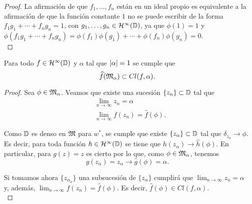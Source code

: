 \begin{proof}
La afirmación de que $f_1, \dots, f_n$ están en un ideal propio es equivalente a la afirmación de que la función constante $1$ no se puede escribir de la forma $f_1 g_1 + \cdots + f_n g_n = 1$, con $g_1, \dots, g_n \in \mathcal{H}^{\infty}(\mathbb{D})$, ya que $\phi (1) = 1$ y $\phi (f_1 g_1 + \cdots + f_n g_n) = \phi (f_1) \phi (g_1) + \cdots + \phi (f_n) \phi (g_n) = 0$. \\
\end{proof}

\begin{prop}
    Para todo $f \in \mathcal{H}^{\infty}(\mathbb{D})$ y $\alpha$ tal que $\left\lvert\alpha\right\rvert = 1$ se cumple que
    \begin{equation*}
        \widehat{f} (\mathfrak{M}_\alpha) \subset Cl(f, \alpha).
    \end{equation*}
\end{prop}

\begin{proof}
    Sea $\phi \in \mathfrak{M}_\alpha$. Veamos que existe una sucesión $\{ z_n\} \subset \mathbb{D}$ tal que
     \leqnomode
    \begin{align}
        & \lim_{n \rightarrow \infty} z_n = \alpha \\
        & \lim_{n \rightarrow \infty} f(z_n)= \widehat{f} (\phi).
    \end{align}

    Como $\mathbb{D}$ es denso en $\mathfrak{M}$ para $w^*$, se cumple que existe $\{z_\alpha\} \subset \mathbb{D}$ tal que $\delta_{z_\alpha} \rightarrow \phi$. Es decir, para toda función $h \in \mathcal{H}^{\infty}(\mathbb{D})$ se tiene que $h (z_\alpha) \rightarrow \widehat{h} (\phi)$. En particular, para $g(z) = z$ es cierto por lo que, como $\phi \in \mathfrak{M}_\alpha$, tenemos
    \begin{equation*}
        g(z_\alpha) = z_\alpha \rightarrow \widehat{g} (\phi) = \alpha.
    \end{equation*}

    Si tomamos ahora $\{z_{\alpha_n}\}$ una subsucesión de $\{z_\alpha\}$ cumplirá que $\lim_{n \rightarrow \infty} z_n = \alpha$ y, además, $\lim_{n \rightarrow \infty} f(z_n)= \widehat{f} (\phi)$. Es decir, $\widehat{f} (\phi) \in Cl (f, \alpha)$. \\
\end{proof}
